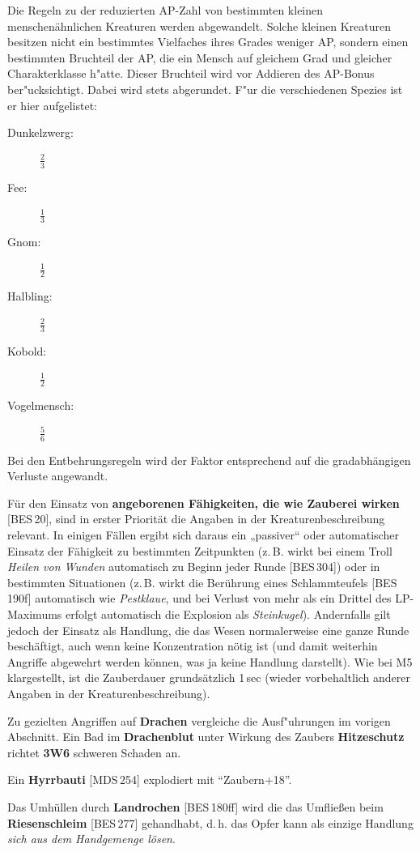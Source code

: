 \documentclass[10pt,a4paper,germanpar]{article}
\begin{document}
Die Regeln zu der reduzierten AP-Zahl von bestimmten kleinen
menschenähnlichen Kreaturen werden abgewandelt. Solche kleinen
Kreaturen besitzen nicht ein bestimmtes Vielfaches ihres Grades
weniger AP, sondern einen bestimmten Bruchteil der AP, die ein Mensch
auf gleichem Grad und gleicher Charakterklasse h"atte. Dieser
Bruchteil wird vor Addieren des AP-Bonus ber"ucksichtigt. Dabei wird
stets abgerundet. F"ur die verschiedenen Spezies ist er hier
aufgelistet:
\begin{description}
\item[Dunkelzwerg:] $\frac{2}{3}$
\item[Fee:] $\frac{1}{3}$
\item[Gnom:] $\frac{1}{2}$
\item[Halbling:] $\frac{2}{3}$
\item[Kobold:] $\frac{1}{2}$
\item[Vogelmensch:] $\frac{5}{6}$
\end{description}

Bei den Entbehrungsregeln wird der Faktor entsprechend auf die
gradabhängigen Verluste angewandt.

Für den Einsatz von \textbf{angeborenen Fähigkeiten, die wie Zauberei
  wirken} [BES\,20], sind in erster Priorität die Angaben in der
Kreaturenbeschreibung relevant. In einigen Fällen ergibt sich daraus
ein „passiver“ oder automatischer Einsatz der Fähigkeit zu bestimmten
Zeitpunkten (z.\,B. wirkt bei einem Troll \emph{Heilen von Wunden}
automatisch zu Beginn jeder Runde [BES\,304]) oder in bestimmten
Situationen (z.\,B. wirkt die Berührung eines Schlammteufels
[BES\,190f] automatisch wie \emph{Pestklaue}, und bei Verlust von mehr
als ein Drittel des LP-Maximums erfolgt automatisch die Explosion als
\emph{Steinkugel}). Andernfalls gilt jedoch der Einsatz als Handlung,
die das Wesen normalerweise eine ganze Runde beschäftigt, auch wenn
keine Konzentration nötig ist (und damit weiterhin Angriffe abgewehrt
werden können, was ja keine Handlung darstellt). Wie bei M5
klargestellt, ist die Zauberdauer grundsätzlich 1\,sec (wieder
vorbehaltlich anderer Angaben in der Kreaturenbeschreibung).

Zu gezielten Angriffen auf \textbf{Drachen} vergleiche die
Ausf"uhrungen im vorigen Abschnitt. Ein Bad im \textbf{Drachenblut}
unter Wirkung des Zaubers \textbf{Hitzeschutz} richtet \textbf{3W6}
schweren Schaden an.

Ein \textbf{Hyrrbauti} [MDS\,254] explodiert mit "`Zaubern+18"'.

Das Umhüllen durch \textbf{Landrochen} [BES\,180ff] wird die das
Umfließen beim \textbf{Riesenschleim} [BES\,277] gehandhabt,
d.\,h. das Opfer kann als einzige Handlung \emph{sich aus dem
  Handgemenge lösen}.
\end{document}
